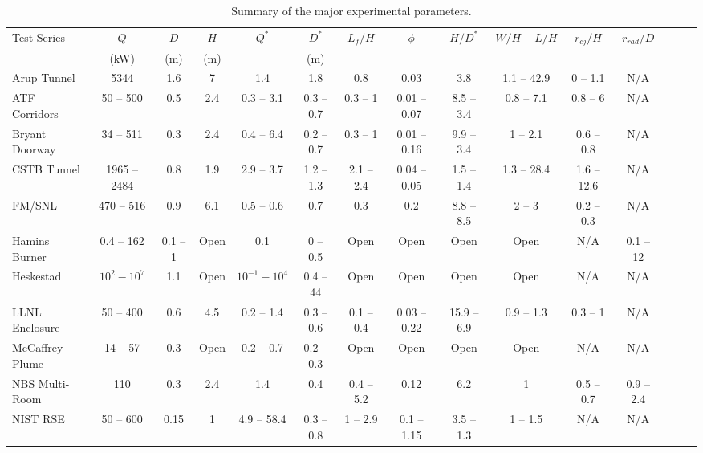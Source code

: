 \newpage
\thispagestyle{empty}
\begin{table}
\caption{Summary of the major experimental parameters. }
\begin{center}
\begin{tabular}{|l|c|c|c|c|c|c|c|c|c|c|c|c|c|c|}
\hline
 Test Series   & $\dot{Q}$    & $D$   & $H$   & $Q^*$   & $D^*$   & $L_f/H$  & $\phi$   & $H/D^*$   & $W/H-L/H$   & $r_{cj}/H$   & $r_{rad}/D$    \\
      & (kW)    & (m)   & (m)   &    & (m)   &   &    &    &    &    &     \\ \hline \hline
Arup Tunnel  & 5344   & 1.6   & 7   & 1.4   & 1.8   & 0.8   & 0.03   & 3.8   & 1.1 -- 42.9   & 0 -- 1.1   & N/A   \\ \hline 
ATF Corridors  & 50 -- 500   & 0.5   & 2.4   & 0.3 -- 3.1   & 0.3 -- 0.7   & 0.3 -- 1   & 0.01 -- 0.07   & 8.5 -- 3.4   & 0.8 -- 7.1   & 0.8 -- 6   & N/A   \\ \hline 
Bryant Doorway  & 34 -- 511   & 0.3   & 2.4   & 0.4 -- 6.4   & 0.2 -- 0.7   & 0.3 -- 1   & 0.01 -- 0.16   & 9.9 -- 3.4   & 1 -- 2.1   & 0.6 -- 0.8   & N/A   \\ \hline 
CSTB Tunnel  & 1965 -- 2484   & 0.8   & 1.9   & 2.9 -- 3.7   & 1.2 -- 1.3   & 2.1 -- 2.4   & 0.04 -- 0.05   & 1.5 -- 1.4   & 1.3 -- 28.4   & 1.6 -- 12.6   & N/A   \\ \hline 
FM/SNL  & 470 -- 516   & 0.9   & 6.1   & 0.5 -- 0.6   & 0.7   & 0.3   & 0.2   & 8.8 -- 8.5   & 2 -- 3   & 0.2 -- 0.3   & N/A   \\ \hline 
Hamins Burner   & 0.4 -- 162   & 0.1 -- 1   & Open  & 0.1   & 0 -- 0.5   & Open  & Open  &Open   & Open   & N/A   & 0.1 -- 12   \\ \hline 
Heskestad   & $10^2-10^7$   & 1.1   & Open  & $10^{-1}-10^4$  & 0.4 -- 44   & Open  & Open  &Open   & Open   & N/A   & N/A   \\ \hline 
LLNL Enclosure  & 50 -- 400   & 0.6   & 4.5   & 0.2 -- 1.4   & 0.3 -- 0.6   & 0.1 -- 0.4   & 0.03 -- 0.22   & 15.9 -- 6.9   & 0.9 -- 1.3   & 0.3 -- 1   & N/A   \\ \hline 
McCaffrey Plume  & 14 -- 57   & 0.3   & Open  & 0.2 -- 0.7   & 0.2 -- 0.3   & Open  & Open  &Open   & Open   & N/A   & N/A   \\ \hline 
NBS Multi-Room  & 110   & 0.3   & 2.4   & 1.4   & 0.4   & 0.4 -- 5.2   & 0.12   & 6.2   & 1   & 0.5 -- 0.7   & 0.9 -- 2.4   \\ \hline 
NIST RSE  & 50 -- 600   & 0.15   & 1   & 4.9 -- 58.4   & 0.3 -- 0.8   & 1 -- 2.9   & 0.1 -- 1.15   & 3.5 -- 1.3   & 1 -- 1.5   & N/A   & N/A   \\ \hline 

\end{tabular}
\end{center}
\end{table}
